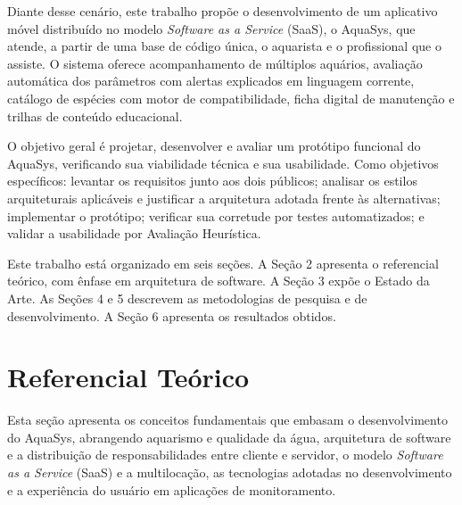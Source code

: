 \documentclass[12pt,oneside,a4paper,brazilian]{abntex2}
\begin{document}
Diante desse cenário, este trabalho propõe o desenvolvimento de um aplicativo móvel distribuído no modelo \textit{Software as a Service} (SaaS), o AquaSys, que atende, a partir de uma base de código única, o aquarista e o profissional que o assiste. O sistema oferece acompanhamento de múltiplos aquários, avaliação automática dos parâmetros com alertas explicados em linguagem corrente, catálogo de espécies com motor de compatibilidade, ficha digital de manutenção e trilhas de conteúdo educacional.

O objetivo geral é projetar, desenvolver e avaliar um protótipo funcional do AquaSys, verificando sua viabilidade técnica e sua usabilidade. Como objetivos específicos: levantar os requisitos junto aos dois públicos; analisar os estilos arquiteturais aplicáveis e justificar a arquitetura adotada frente às alternativas; implementar o protótipo; verificar sua corretude por testes automatizados; e validar a usabilidade por Avaliação Heurística.

Este trabalho está organizado em seis seções. A Seção 2 apresenta o referencial teórico, com ênfase em arquitetura de software. A Seção 3 expõe o Estado da Arte. As Seções 4 e 5 descrevem as metodologias de pesquisa e de desenvolvimento. A Seção 6 apresenta os resultados obtidos.


\section{Referencial Teórico}
Esta seção apresenta os conceitos fundamentais que embasam o desenvolvimento do AquaSys, abrangendo aquarismo e qualidade da água, arquitetura de software e a distribuição de responsabilidades entre cliente e servidor, o modelo \textit{Software as a Service} (SaaS) e a multilocação, as tecnologias adotadas no desenvolvimento e a experiência do usuário em aplicações de monitoramento.
\end{document}
